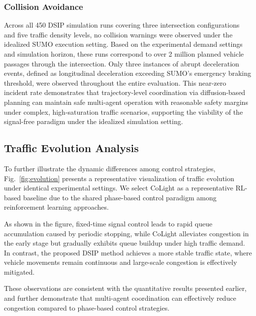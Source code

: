\documentclass[journal]{IEEEtran}
\begin{document}
\subsubsection{Collision Avoidance}

Across all 450 DSIP simulation runs covering three intersection configurations and five traffic density levels, no collision warnings were observed under the idealized SUMO execution setting. Based on the experimental demand settings and simulation horizon, these runs correspond to over 2 million planned vehicle passages through the intersection. Only three instances of abrupt deceleration events, defined as longitudinal deceleration exceeding SUMO's emergency braking threshold, were observed throughout the entire evaluation. This near-zero incident rate demonstrates that trajectory-level coordination via diffusion-based planning can maintain safe multi-agent operation with reasonable safety margins under complex, high-saturation traffic scenarios, supporting the viability of the signal-free paradigm under the idealized simulation setting.



\subsection{Traffic Evolution Analysis}

To further illustrate the dynamic differences among control strategies, Fig.~\ref{fig:evolution} presents a representative visualization of traffic evolution under identical experimental settings. We select CoLight as a representative RL-based baseline due to the shared phase-based control paradigm among reinforcement learning approaches.

As shown in the figure, fixed-time signal control leads to rapid queue accumulation caused by periodic stopping, while CoLight alleviates congestion in the early stage but gradually exhibits queue buildup under high traffic demand. In contrast, the proposed DSIP method achieves a more stable traffic state, where vehicle movements remain continuous and large-scale congestion is effectively mitigated.

These observations are consistent with the quantitative results presented earlier, and further demonstrate that multi-agent coordination can effectively reduce congestion compared to phase-based control strategies.
\end{document}
